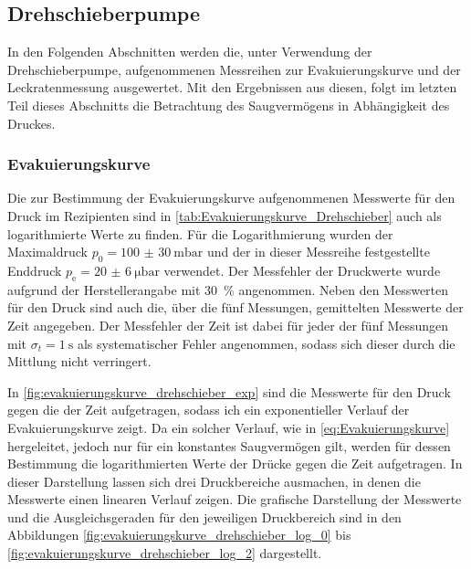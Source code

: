 \subsection{Drehschieberpumpe}
In den Folgenden Abschnitten werden die, unter Verwendung der Drehschieberpumpe, aufgenommenen Messreihen 
zur Evakuierungskurve und der Leckratenmessung ausgewertet. Mit den Ergebnissen aus diesen, folgt im letzten Teil dieses 
Abschnitts die Betrachtung des Saugvermögens in Abhängigkeit des Druckes.

\subsubsection{Evakuierungskurve}
Die zur Bestimmung der Evakuierungskurve aufgenommenen Messwerte für den Druck
im Rezipienten sind in \cref{tab:Evakuierungskurve_Drehschieber} auch als logarithmierte
Werte zu finden. Für die Logarithmierung wurden der Maximaldruck $p_{0} =\SI{100(30)}{\milli\bar} $
und der in dieser Messreihe festgestellte Enddruck $p_{\mathrm{e}} =\SI{20(6)}{\micro\bar}$ verwendet.
Der Messfehler der Druckwerte wurde aufgrund der Herstellerangabe \cite{Pfeifer} mit \SI{30}{\percent} angenommen.
Neben den Messwerten für den Druck sind auch die, über die fünf Messungen, gemittelten Messwerte der Zeit 
angegeben. Der Messfehler der Zeit ist dabei für jeder der fünf Messungen mit $\sigma_{t} = \SI{1}{\s}$ als systematischer
Fehler angenommen, sodass sich dieser durch die Mittlung nicht verringert.



In \cref{fig:evakuierungskurve_drehschieber_exp} sind die Messwerte für den Druck gegen die der Zeit aufgetragen,
sodass ich ein exponentieller Verlauf der Evakuierungskurve zeigt. Da ein solcher Verlauf, wie in 
\eqref{eq:Evakuierungskurve} hergeleitet, jedoch nur für ein konstantes Saugvermögen gilt, werden für dessen Bestimmung die logarithmierten Werte der Drücke gegen die Zeit aufgetragen.
In dieser Darstellung lassen sich drei Druckbereiche ausmachen,
in denen die Messwerte einen linearen Verlauf zeigen. Die grafische Darstellung der Messwerte und die 
Ausgleichsgeraden für den jeweiligen Druckbereich sind in den Abbildungen \ref{fig:evakuierungskurve_drehschieber_log_0} 
bis \ref{fig:evakuierungskurve_drehschieber_log_2} dargestellt.\\



{%

\FloatBarrier}

